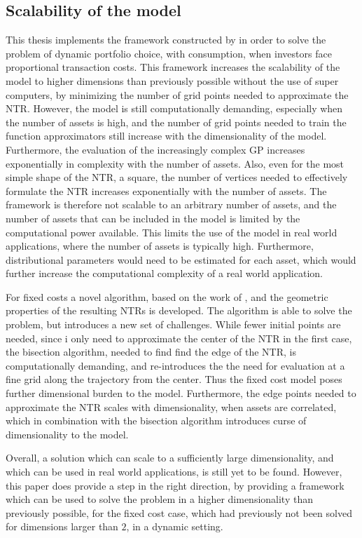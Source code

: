 \documentclass[11pt]{article}
\begin{document}
\subsection{Scalability of the model} \label{Subsection: Scalability of the model}
This thesis implements the framework constructed by \autocite{Scheidegger2023}
in order to solve the problem of dynamic portfolio choice, with consumption,
when investors face proportional transaction costs. This framework increases the scalability of the model to higher dimensions
than previously possible without the use of super computers, by minimizing the number of grid points needed to approximate the NTR.
However, the model is still computationally demanding, especially when the number of assets is high, and the number of grid points
needed to train the function approximators still increase with the dimensionality of the model.
Furthermore, the evaluation of the increasingly complex \ac{GP} increases exponentially in complexity with the number of assets.
Also, even for the most simple shape of the \ac{NTR}, a square, the number of vertices needed to effectively 
formulate the \ac{NTR} increases exponentially with the number of assets.
The framework is therefore not scalable to an arbitrary number of assets, and the number of assets that can be included in the model is limited by the computational power available.
This limits the use of the model in real world applications, where the number of assets is typically high.
Furthermore, distributional parameters would need to be estimated for each asset, which would further increase the computational complexity of
a real world application.

For fixed costs a novel algorithm, based on the work of \autocite{Scheidegger2023}, and the geometric properties
of the resulting \ac{NTR}s is developed. The algorithm is able to solve the problem, but introduces a new set of challenges.
While fewer initial points are needed, since i only need to approximate the center of the \ac{NTR} in the first case,
the bisection algorithm, needed to find find the edge of the \ac{NTR}, is computationally demanding, and re-introduces the the need
for evaluation at a fine grid along the trajectory from the center. Thus the fixed cost model poses further dimensional burden to the model.
Furthermore, the edge points needed to approximate the \ac{NTR} scales with dimensionality,
when assets are correlated, which in combination with the bisection algorithm introduces curse of dimensionality to the model.

Overall, a solution which can scale to a sufficiently large dimensionality, and which can be used in real world applications, is still yet to be found.
However, this paper does provide a step in the right direction, by providing a framework which can be used to solve the problem in a higher dimensionality than previously possible,
for the fixed cost case, which had previously not been solved for dimensions larger than $2$, in a dynamic setting.
\end{document}

